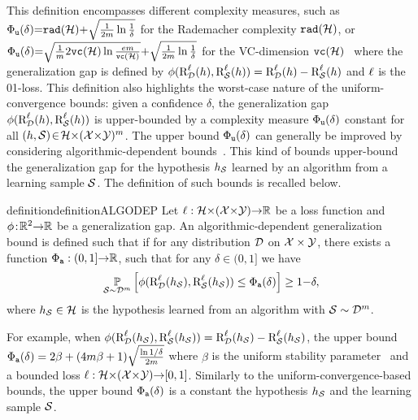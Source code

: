 \documentclass[twoside]{article}
\theoremstyle{plain}
\begin{document}
This definition encompasses different complexity measures, such as $\Phi_{{\tt u}}(\delta){=}{\tt rad}(\mathcal{H}) {+} \sqrt{\frac{1}{2m}\ln\frac{1}{\delta}}$ for the Rademacher complexity ${\tt rad}(\mathcal{H})$, or $\Phi_{{\tt u}}(\delta){=}\sqrt{\frac{1}{m}2{\tt vc}(\mathcal{H})\ln\frac{em}{{\tt vc}(\mathcal{H})}}{+}\sqrt{\tfrac{1}{2m}\ln\frac{1}{\delta}}$ for the VC-dimension ${\tt vc}(\mathcal{H})$~\citep[see Theorem 3.3 and Corollary 3.19 of ][]{mohri2012foundations} where the generalization gap is defined by $\phi(\text{R}^{\ell}_{\mathcal{D}}(h),\text{R}^{\ell}_{\mathcal{S}}(h))=\text{R}^{\ell}_{\mathcal{D}}(h)-\text{R}^{\ell}_{\mathcal{S}}(h)$ and $\ell$ is the 01-loss.
This definition also highlights the worst-case nature of the uniform-convergence bounds:
given a confidence $\delta$, the generalization gap $\phi(\text{R}^{\ell}_{\mathcal{D}}(h), \text{R}^{\ell}_{\mathcal{S}}(h))$ is upper-bounded by a complexity measure $\Phi_{{\tt u}}(\delta)$ constant for all $(h,\mathcal{S})\!\in\!\mathcal{H}{\times}(\mathcal{X}{\times}\mathcal{Y})^m$.
The upper bound $\Phi_{{\tt u}}(\delta)$ can generally be improved by considering algorithmic-dependent bounds~\citep{bousquet2002stability,xu2012robustness}.
This kind of bounds upper-bound the generalization gap for the hypothesis $h_{\mathcal{S}}$ learned by an algorithm from a learning sample $\mathcal{S}$.
The definition of such bounds is recalled below.

\begin{restatable}{definition}{definitionALGODEP}\label{def:algo} 
Let $\ell: \mathcal{H}{\times}(\mathcal{X}{\times}\mathcal{Y}){\to}\mathbb{R}$ be a loss function and $\phi\!:\! \mathbb{R}^2{\to}\mathbb{R}$ be a generalization gap. 
An algorithmic-dependent generalization bound is defined such that if for any distribution $\mathcal{D}$ on $\mathcal{X}\times\mathcal{Y}$, there exists a function $\Phi_{{\tt a}}: (0,1]{\to} \mathbb{R}$, such that for any  $\delta\in(0, 1]$ we have
\begin{align}
    \operatorname*{\mathbb{P}}_{\mathcal{S}\sim\mathcal{D}^m}\Big[ \phi(\text{R}^{\ell}_{\mathcal{D}}(h_{\mathcal{S}}), \text{R}^{\ell}_{\mathcal{S}}(h_{\mathcal{S}})) \le \Phi_{{\tt a}}(\delta) \Big] \ge 1{-}\delta,\label{eq:algo}
\end{align}
where $h_{\mathcal{S}}\in\mathcal{H}$ is the hypothesis learned from an algorithm with $\mathcal{S}\sim\mathcal{D}^m$.
\end{restatable}

For example, when $\phi(\text{R}^{\ell}_{\mathcal{D}}(h_{\mathcal{S}}), \text{R}^{\ell}_{\mathcal{S}}(h_{\mathcal{S}})) = \text{R}^{\ell}_{\mathcal{D}}(h_{\mathcal{S}}) - \text{R}^{\ell}_{\mathcal{S}}(h_{\mathcal{S}})$, the upper bound $\Phi_{{\tt a}}(\delta)=2\beta + (4m\beta+1)\sqrt{\frac{\ln1/\delta}{2m}}$ where $\beta$ is the uniform stability parameter~\citep[see,][]{bousquet2002stability} and a bounded loss $\ell: \mathcal{H}{\times}(\mathcal{X}{\times}\mathcal{Y}){\to} [0, 1]$.
Similarly to the uniform-convergence-based bounds, the upper bound $\Phi_{{\tt a}}(\delta)$ is a constant \wrt the hypothesis $h_{\mathcal{S}}$ and the learning sample $\mathcal{S}$.
\end{document}
